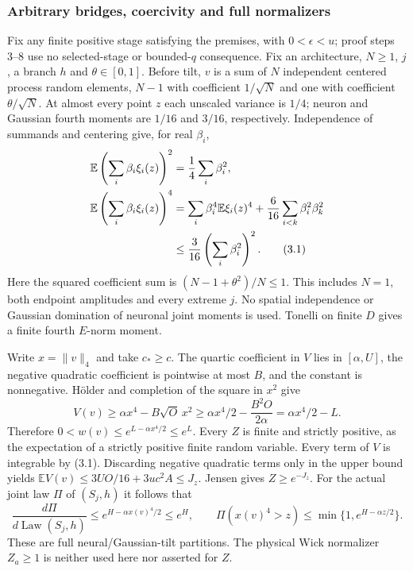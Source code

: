\documentclass[11pt]{article}
\theoremstyle{plain}
\theoremstyle{definition}
\theoremstyle{remark}
\newcommand{\E}{\mathbb{E}}
\DeclareMathOperator{\Law}{Law}
\begin{document}
\subsubsection{Arbitrary bridges, coercivity and full normalizers}
Fix any finite positive stage satisfying the premises, with $0<\epsilon<u$;
proof steps 3--8 use no selected-stage or bounded-$q$ consequence.
Fix an architecture, $N\ge1$, $j$, a branch $h$ and $\theta\in[0,1]$.
Before tilt, $v$ is a sum of $N$ independent centered process random
elements, $N-1$ with coefficient $1/\sqrt N$ and one with coefficient
$\theta/\sqrt N$. At almost every point $z$ each unscaled variance is
$1/4$; neuron and Gaussian fourth moments are $1/16$ and $3/16$,
respectively. Independence of summands and centering give, for real $\beta_i$,
\begin{align}
 \E\left(\sum_i\beta_i\xi_i(z)\right)^2&=\frac14\sum_i\beta_i^2,\notag\\
 \E\left(\sum_i\beta_i\xi_i(z)\right)^4
 &=\sum_i\beta_i^4\E\xi_i(z)^4
          +\frac6{16}\sum_{i<k}\beta_i^2\beta_k^2\notag\\
 &\le\frac3{16}\left(\sum_i\beta_i^2\right)^2.\tag{3.1}
\end{align}
Here the squared coefficient sum is $(N-1+\theta^2)/N\le1$.
This includes $N=1$, both endpoint amplitudes and every extreme $j$.
No spatial independence or Gaussian domination of neuronal joint moments
is used. Tonelli on finite $D$ gives a finite fourth $E$-norm moment.

Write $x=\|v\|_4$ and take $c_*\ge c$. The quartic coefficient in $V$
lies in $[\alpha,U]$, the negative quadratic coefficient is pointwise at
most $B$, and the constant is nonnegative. H\"older and completion of the
square in $x^2$ give
\begin{equation}
 V(v)\ge\alpha x^4-B\sqrt O\,x^2
       \ge\alpha x^4/2-\frac{B^2O}{2\alpha}
       =\alpha x^4/2-L.\tag{3.2}
\end{equation}
Therefore $0<w(v)\le e^{L-\alpha x^4/2}\le e^L$.
Every $Z$ is finite and strictly positive, as the expectation of a strictly
positive finite random variable. Every term of $V$ is integrable by (3.1).
Discarding negative quadratic terms only in the upper bound yields
$\E V(v)\le3UO/16+3uc^2A\le J_z$. Jensen gives $Z\ge e^{-J_z}$.
For the actual joint law $\Pi$ of $(S_j,h)$ it follows that
\begin{equation}
 \frac{d\Pi}{d\Law(S_j,h)}\le e^{H-\alpha x(v)^4/2}\le e^H,
 \qquad\Pi(x(v)^4>z)\le\min\{1,e^{H-\alpha z/2}\}.\tag{3.3}
\end{equation}
These are full neural/Gaussian-tilt partitions. The physical Wick
normalizer $Z_a\ge1$ is neither used here nor asserted for $Z$.
\end{document}

